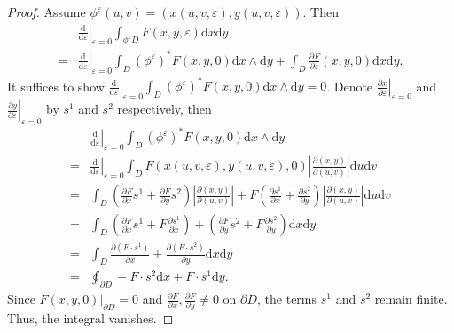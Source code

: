 \documentclass[11pt]{amsart}
\newcommand{\ep}{\varepsilon}
\begin{document}
\begin{proof}
	Assume $\phi^{\ep}(u,v)=(x(u,v,\ep),y(u,v,\ep))$. Then
	\begin{equation}
		\begin{aligned}
			&\left.\frac{\mathrm{d}}{\mathrm{d}\ep}\right|_{\ep=0}\int_{\phi^{\ep}D}F(x,y,\ep)\mathrm{d}x\mathrm{d}y\\
			=&\left. \frac{\mathrm{d}}{\mathrm{d}\ep}\right| _{\ep=0}\int_{D} (\phi^{\ep})^{*} F(x,y,0)\mathrm{d}x\wedge\mathrm{d}y+\int_{D} \frac{\partial F}{\partial \ep}(x,y,0)\mathrm{d}x\mathrm{d}y.
		\end{aligned}
	\end{equation}
	It suffices to show $\left. \frac{\mathrm{d}}{\mathrm{d}\ep}\right| _{\ep=0}\int_{D} (\phi^{\ep})^{*} F(x,y,0)\mathrm{d}x\wedge\mathrm{d}y=0$. Denote $\left. \frac{\partial x}{\partial \ep}\right|_{\ep=0}$ and $\left. \frac{\partial y}{\partial \ep}\right|_{\ep=0}$ by $s^{1}$ and $s^{2}$ respectively, then
	\begin{equation}
		\begin{aligned}
			&\left. \frac{\mathrm{d}}{\mathrm{d}\ep}\right| _{\ep=0}\int_{D} (\phi^{\ep})^{*} F(x,y,0)\mathrm{d}x\wedge\mathrm{d}y\\
			=&\left. \frac{\mathrm{d}}{\mathrm{d}\ep}\right| _{\ep=0}\int_{D}F(x(u,v,\ep),y(u,v,\ep),0)\left| \frac{\partial(x,y)}{\partial(u,v)}\right| \mathrm{d}u\mathrm{d}v\\
			=&\int_{D}\left( \frac{\partial F}{\partial x}s^{1}+\frac{\partial F}{\partial y}s^{2}\right) \left| \frac{\partial(x,y)}{\partial(u,v)}\right| +F\left( \frac{\partial s^{1}}{\partial x}+\frac{\partial s^{2}}{\partial y}\right)\left| \frac{\partial(x,y)}{\partial(u,v)}\right| \mathrm{d}u\mathrm{d}v\\
			=&\int_{D}\left( \frac{\partial F}{\partial x}s^{1}+F\frac{\partial s^{1}}{\partial x}\right) +\left( \frac{\partial F}{\partial y}s^{2}+F\frac{\partial s^{2}}{\partial y}\right) \mathrm{d}x\mathrm{d}y\\
			=&\int_{D}\frac{\partial (F\cdot s^{1})}{\partial x}+\frac{\partial (F\cdot s^{2})}{\partial y} \mathrm{d}x\mathrm{d}y\\
			=&\oint_{\partial D}-F\cdot s^{2}\mathrm{d}x+F\cdot s^{1}\mathrm{d}y.
		\end{aligned}
	\end{equation}
	Since $F(x,y,0)|_{\partial D}=0$ and $\frac{\partial F}{\partial x}, \frac{\partial F}{\partial y} \neq 0$ on $\partial D$, the terms $s^1$ and $s^2$ remain finite. Thus, the integral vanishes.
\end{proof}
\end{document}
